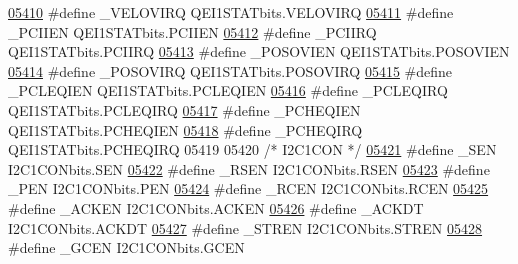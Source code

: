\begin{DoxyCode}
\hypertarget{a00009_source_l05410}{}\hyperlink{a00009_aeb9bc6491432ee1e066b12009b0fd255}{05410} \textcolor{preprocessor}{#define \_VELOVIRQ QEI1STATbits.VELOVIRQ}
\hypertarget{a00009_source_l05411}{}\hyperlink{a00009_a4fe3054e92d232dfe794253854ab21ec}{05411} \textcolor{preprocessor}{#define \_PCIIEN QEI1STATbits.PCIIEN}
\hypertarget{a00009_source_l05412}{}\hyperlink{a00009_a4c6c19fc3593b90b08070048eb05e31d}{05412} \textcolor{preprocessor}{#define \_PCIIRQ QEI1STATbits.PCIIRQ}
\hypertarget{a00009_source_l05413}{}\hyperlink{a00009_af40c39003bb40617c7980f76b4650430}{05413} \textcolor{preprocessor}{#define \_POSOVIEN QEI1STATbits.POSOVIEN}
\hypertarget{a00009_source_l05414}{}\hyperlink{a00009_a3eefc661a5536e7cdf62e20cd67eabed}{05414} \textcolor{preprocessor}{#define \_POSOVIRQ QEI1STATbits.POSOVIRQ}
\hypertarget{a00009_source_l05415}{}\hyperlink{a00009_ac62809cbe23c43fea85cabc7f77df256}{05415} \textcolor{preprocessor}{#define \_PCLEQIEN QEI1STATbits.PCLEQIEN}
\hypertarget{a00009_source_l05416}{}\hyperlink{a00009_aac259c75f57be462370a00762be9a247}{05416} \textcolor{preprocessor}{#define \_PCLEQIRQ QEI1STATbits.PCLEQIRQ}
\hypertarget{a00009_source_l05417}{}\hyperlink{a00009_aa1093c63c618c18559a6fb7067e72b0b}{05417} \textcolor{preprocessor}{#define \_PCHEQIEN QEI1STATbits.PCHEQIEN}
\hypertarget{a00009_source_l05418}{}\hyperlink{a00009_a71308add8fdcf0f1e1aa903d2574e374}{05418} \textcolor{preprocessor}{#define \_PCHEQIRQ QEI1STATbits.PCHEQIRQ}
05419 
05420 \textcolor{comment}{/* I2C1CON */}
\hypertarget{a00009_source_l05421}{}\hyperlink{a00009_a7c8ad43f77a5137f25db0583d0e21234}{05421} \textcolor{preprocessor}{#define \_SEN I2C1CONbits.SEN}
\hypertarget{a00009_source_l05422}{}\hyperlink{a00009_a911499455fea3d5248d9c22272ae88bc}{05422} \textcolor{preprocessor}{#define \_RSEN I2C1CONbits.RSEN}
\hypertarget{a00009_source_l05423}{}\hyperlink{a00009_aac2c59308ce8a4741bf5dd5298c62d3c}{05423} \textcolor{preprocessor}{#define \_PEN I2C1CONbits.PEN}
\hypertarget{a00009_source_l05424}{}\hyperlink{a00009_a8ece677ceb54047355b0bc18114ac4ef}{05424} \textcolor{preprocessor}{#define \_RCEN I2C1CONbits.RCEN}
\hypertarget{a00009_source_l05425}{}\hyperlink{a00009_a547291ece86d3c8d88a0af37d8bbdf21}{05425} \textcolor{preprocessor}{#define \_ACKEN I2C1CONbits.ACKEN}
\hypertarget{a00009_source_l05426}{}\hyperlink{a00009_aa9a28d6a5f613a9b9603b642ad2e599c}{05426} \textcolor{preprocessor}{#define \_ACKDT I2C1CONbits.ACKDT}
\hypertarget{a00009_source_l05427}{}\hyperlink{a00009_aeb20ac5a21f1d2c922b46997cff1109d}{05427} \textcolor{preprocessor}{#define \_STREN I2C1CONbits.STREN}
\hypertarget{a00009_source_l05428}{}\hyperlink{a00009_a931dddd3d08901bf6dded5ccf4b20ccb}{05428} \textcolor{preprocessor}{#define \_GCEN I2C1CONbits.GCEN}

\end{DoxyCode}
